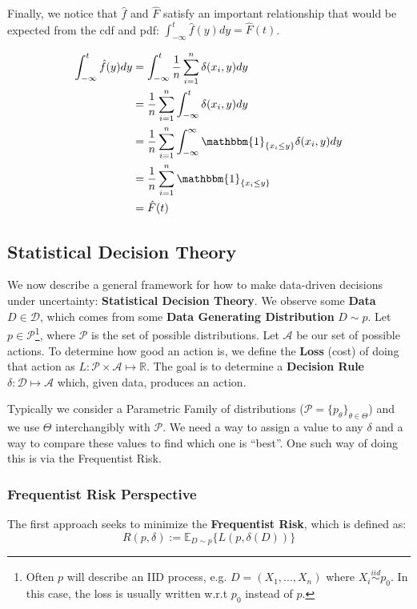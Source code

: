 \documentclass[]{article}
\theoremstyle{mattstyle}
\theoremstyle{definition}
\begin{document}
Finally, we notice that $\hat{f}$ and $\hat{F}$ satisfy an important relationship that would be expected from the cdf and pdf: $\int_{-\infty}^{t}\hat{f}(y)dy = \hat{F}(t)$.

\begin{align*}
\int_{-\infty}^{t}\hat{f}(y)dy &= \int_{-\infty}^{t} \frac{1}{n}\sum_{i=1}^n \delta(x_i, y)dy\\
&= \frac{1}{n}\sum_{i=1}^n \int_{-\infty}^{t}  \delta(x_i, y)dy\\
&= \frac{1}{n}\sum_{i=1}^n \int_{-\infty}^{\infty} \mathbbm{1}_{\{x_i \le y\}} \delta(x_i, y)dy\\
&= \frac{1}{n}\sum_{i=1}^n \mathbbm{1}_{\{x_i \le y\}}\\
&= \hat{F}(t)
\end{align*}

\newpage

\subsection{Statistical Decision Theory}\label{sec:dectheory}

We now describe a general framework for how to make data-driven decisions under uncertainty: \textbf{Statistical Decision Theory}. We observe some \textbf{Data} \(D \in \mathcal{D}\), which comes from some \textbf{Data Generating Distribution} \(D \sim p\). Let \(p\in \mathcal{P}\)\footnote{Often $p$ will describe an IID process, e.g. $D = (X_1,...,X_n)$ where $X_i \overset{iid}\sim p_0$. In this case, the loss is usually written w.r.t $p_0$ instead of $p$.}, where \(\mathcal{P}\) is the set of possible distributions. Let \(\mathcal{A}\) be our set of possible actions. To determine how good an action is, we define the \textbf{Loss} (cost) of doing that action as \(L: \mathcal{P} \times \mathcal{A} \mapsto \mathbb{R}\). The goal is to determine a \textbf{Decision Rule} \(\delta: \mathcal{D} \mapsto \mathcal{A}\) which, given data, produces an action.

Typically we consider a Parametric Family of distributions ($\mathcal{P} = \{p_{\theta}\}_{\theta\in\Theta}$) and we use \(\Theta\) interchangibly with \(\mathcal{P}\). We need a way to assign a value to any \(\delta\) and a way to compare these values to find which one is ``best''. One such way of doing this is via the Frequentist Risk.

\subsubsection{Frequentist Risk Perspective} 
The first approach seeks to minimize the \textbf{Frequentist Risk}, which is defined as:
\begin{equation}\label{eq:1}
R(p,\delta) := \mathbb{E}_{D\sim p}\{L(p,\delta(D))\}
\end{equation}
\end{document}
